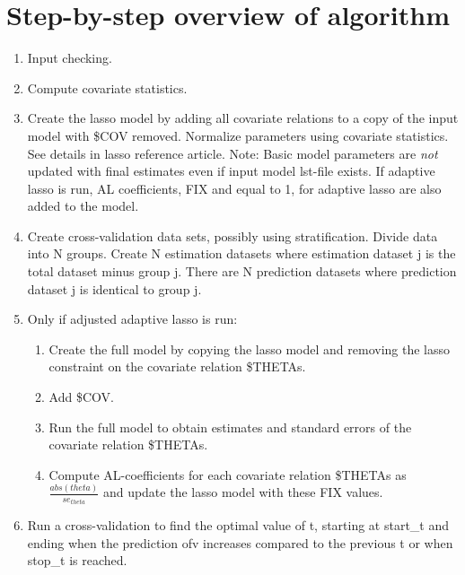 \section{Step-by-step overview of algorithm}

\begin{enumerate}
\item Input checking.
\item Compute covariate statistics.
\item Create the lasso model by adding all covariate relations to a copy of the input model with \$COV removed. 
Normalize parameters using covariate statistics. See details in lasso reference article. 
Note: Basic model parameters are \emph{not} updated with final estimates even if input model
lst-file exists. If adaptive lasso is run, AL coefficients, FIX and equal to 1, 
for adaptive lasso are also added to the model.
\item Create cross-validation data sets, possibly using stratification. Divide data into N groups. Create N estimation datasets where estimation dataset j is the total dataset minus group j. There are N prediction datasets where prediction dataset j is identical to group j. 
\item Only if adjusted adaptive lasso is run: 
\begin{enumerate}
\item Create the full model by copying the lasso model and removing the
lasso constraint on the covariate relation \$THETAs. 
\item Add \$COV. 
\item Run the full model to obtain estimates and standard errors of the covariate relation \$THETAs.
\item Compute AL-coefficients for each covariate relation \$THETAs 
as $\frac{abs(theta)}{se_{theta}}$
and update the lasso model with these FIX values.
\end{enumerate}
\item Run a cross-validation to find the optimal value of t, 
starting at start\_t and ending when the prediction ofv increases compared to the
previous t or when stop\_t is reached.

\end{enumerate}
